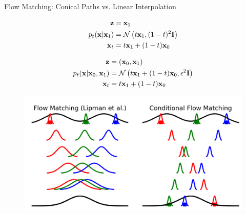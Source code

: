 \documentclass{beamer}
\begin{document}
\begin{frame}{Flow Matching: Conical Paths vs. Linear Interpolation}
	\begin{minipage}[t]{0.5\columnwidth}
		\begin{align*}
			\mathbf{z} & = \mathbf{x}_1 \\
			p_t(\mathbf{x} | \mathbf{x}_1) &= \mathcal{N}\left(t \mathbf{x}_1, (1-t)^2 \mathbf{I}\right) \\
			\mathbf{x}_t &= t \mathbf{x}_1 + (1 - t) \mathbf{x}_0 
		\end{align*}
	\end{minipage}%
	\begin{minipage}[t]{0.5\columnwidth}
		\begin{align*}
			\mathbf{z} & = (\mathbf{x}_0, \mathbf{x}_1) \\
			p_t(\mathbf{x} | \mathbf{x}_0, \mathbf{x}_1) &= \mathcal{N}\left(t \mathbf{x}_1 + (1 - t) \mathbf{x}_0, \epsilon^2 \mathbf{I}\right) \\
			\mathbf{x}_t &= t \mathbf{x}_1 + (1 - t) \mathbf{x}_0
		\end{align*}
	\end{minipage}
	\eqpause
	\begin{figure}
		\centering
		\includegraphics[width=0.8\linewidth]{figs/compare_conditionings}
	\end{figure}
\end{frame}
\end{document}
